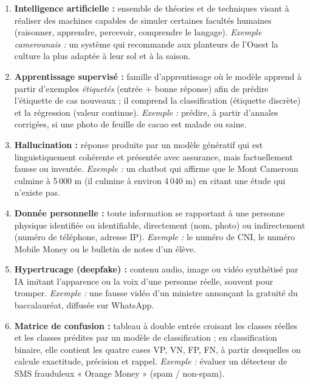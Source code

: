 \documentclass[11pt]{article}
\begin{document}
\begin{corrige}
\begin{enumerate}
\item \textbf{Intelligence artificielle :} ensemble de théories et de techniques visant à réaliser des machines capables de simuler certaines facultés humaines (raisonner, apprendre, percevoir, comprendre le langage). \emph{Exemple camerounais :} un système qui recommande aux planteurs de l'Ouest la culture la plus adaptée à leur sol et à la saison.
\item \textbf{Apprentissage supervisé :} famille d'apprentissage où le modèle apprend à partir d'exemples \emph{étiquetés} (entrée + bonne réponse) afin de prédire l'étiquette de cas nouveaux ; il comprend la classification (étiquette discrète) et la régression (valeur continue). \emph{Exemple :} prédire, à partir d'annales corrigées, si une photo de feuille de cacao est malade ou saine.
\item \textbf{Hallucination :} réponse produite par un modèle génératif qui est linguistiquement cohérente et présentée avec assurance, mais factuellement fausse ou inventée. \emph{Exemple :} un chatbot qui affirme que le Mont Cameroun culmine à 5\,000 m (il culmine à environ 4\,040 m) en citant une étude qui n'existe pas.
\item \textbf{Donnée personnelle :} toute information se rapportant à une personne physique identifiée ou identifiable, directement (nom, photo) ou indirectement (numéro de téléphone, adresse IP). \emph{Exemple :} le numéro de CNI, le numéro Mobile Money ou le bulletin de notes d'un élève.
\item \textbf{Hypertrucage (deepfake) :} contenu audio, image ou vidéo synthétisé par IA imitant l'apparence ou la voix d'une personne réelle, souvent pour tromper. \emph{Exemple :} une fausse vidéo d'un ministre annonçant la gratuité du baccalauréat, diffusée sur WhatsApp.
\item \textbf{Matrice de confusion :} tableau à double entrée croisant les classes réelles et les classes prédites par un modèle de classification ; en classification binaire, elle contient les quatre cases VP, VN, FP, FN, à partir desquelles on calcule exactitude, précision et rappel. \emph{Exemple :} évaluer un détecteur de SMS frauduleux « Orange Money » (spam / non-spam).
\end{enumerate}
\end{corrige}
\end{document}

